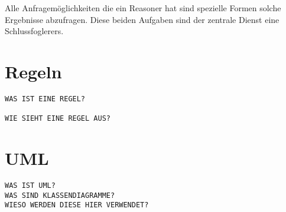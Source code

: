 Alle Anfragemöglichkeiten die ein Reasoner hat sind spezielle Formen solche Ergebnisse abzufragen. Diese beiden Aufgaben sind der zentrale Dienst eine Schlussfoglerers. 

\section{Regeln}
\begin{verbatim}
WAS IST EINE REGEL?

WIE SIEHT EINE REGEL AUS?
\end{verbatim}

\section{UML}
\begin{verbatim}
WAS IST UML?
WAS SIND KLASSENDIAGRAMME?
WIESO WERDEN DIESE HIER VERWENDET?
\end{verbatim}